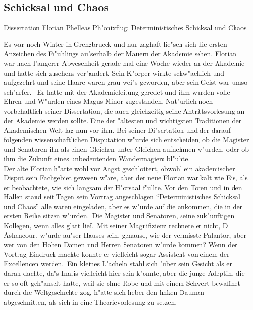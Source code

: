 \documentclass[a5paper,8pt]{book}
\begin{document}
\newpage

\subsection{Schicksal und Chaos}

Dissertation Florian Phelleas Ph"onixflug: Deterministisches Schicksal und Chaos

Es war noch Winter in Grenzbrueck und nur zaghaft lie"sen sich die ersten Anzeichen des Fr"uhlings au"serhalb der Mauern der Akademie sehen. Florian war nach l"angerer 
Abwesenheit gerade mal eine Woche wieder an der Akademie und hatte sich zusehens ver"andert. Sein K"orper wirkte schw"achlich und aufgezehrt und seine Haare waren grau-wei"s 
geworden, aber sein Geist war umso sch"arfer. \
Er hatte mit der Akademieleitung geredet und ihm wurden volle Ehren und W"urden eines Magus Minor zugestanden. Nat"urlich noch vorbehaltlich seiner Dissertation, die auch 
gleichzeitig seine Antrittsvorlesung an der Akademie werden sollte. Eine der "altesten und wichtigsten Traditionen der Akademischen Welt lag nun vor ihm. Bei seiner 
Di"sertation und der darauf folgenden wissenschaftlichen Disputation w"urde sich entscheiden, ob die Magister und Senatoren ihn als einen Gleichen unter Gleichen aufnehmen 
w"urden, oder ob ihm die Zukunft eines unbedeutenden Wandermagiers bl"uhte.\\

Der alte Florian h"atte wohl vor Angst geschlottert, obwohl ein akademischer Disput sein Fachgebiet gewesen w"are, aber der neue Florian war kalt wie Eis, als er beobachtete, 
wie sich langsam der H"orsaal f"ullte. Vor den Toren und in den Hallen stand seit Tagen sein Vortrag angeschlagen ``Deterministisches Schicksal und Chaos'' alle waren eingeladen, 
aber es w"urde auf die ankommen, die in der ersten Reihe sitzen w"urden.\
Die Magister und Senatoren, seine zuk"unftigen Kollegen, wenn alles glatt lief.\
Mit seiner Magnifizienz rechnete er nicht, D \`{A}shencourt w"urde au"ser Hauses sein, genauso, wie der vermisste Palantor, aber wer von den Hohen Damen und Herren Senatoren 
w"urde kommen? Wenn der Vortrag Eindruck machte konnte er vielleicht sogar Assistent von einem der Excellencen werden.\
Ein kleines L"acheln stahl sich "uber sein Gesicht als er daran dachte, da"s Inaris vielleicht hier sein k"onnte, aber die junge Adeptin, die er so oft geh"anselt hatte, weil 
sie ohne Robe und mit einem Schwert bewaffnet durch die Weltgeschichte zog, h"atte sich lieber den linken Daumen abgeschnitten, als sich in eine Theorievorlesung zu setzen.\\
\end{document}
